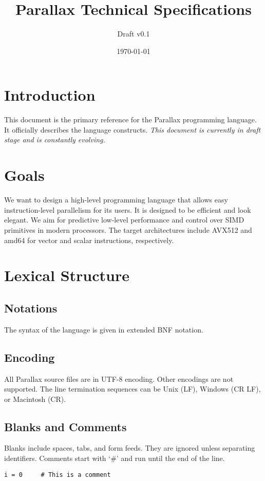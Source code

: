 \documentclass{article}
\title{Parallax Technical Specifications}
\author{Draft v0.1}
\date{\today}
\begin{document}
\maketitle

\section{Introduction}
This document is the primary reference for the Parallax programming language. It officially describes the language constructs. \textit{This document is currently in draft stage and is constantly evolving.}

\section{Goals}
We want to design a high-level programming language that allows easy instruction-level parallelism for its users. It is designed to be efficient and look elegant. We aim for predictive low-level performance and control over SIMD primitives in modern processors. The target architectures include AVX512 and amd64 for vector and scalar instructions, respectively.

\section{Lexical Structure}

\subsection{Notations}
The syntax of the language is given in extended BNF notation.

\subsection{Encoding}
All Parallax source files are in UTF-8 encoding. Other encodings are not supported. The line termination sequences can be Unix (LF), Windows (CR LF), or Macintosh (CR).

\subsection{Blanks and Comments}
Blanks include spaces, tabs, and form feeds. They are ignored unless separating identifiers. Comments start with `\#' and run until the end of the line.

\begin{verbatim}
i = 0     # This is a comment
\end{verbatim}
\end{document}
